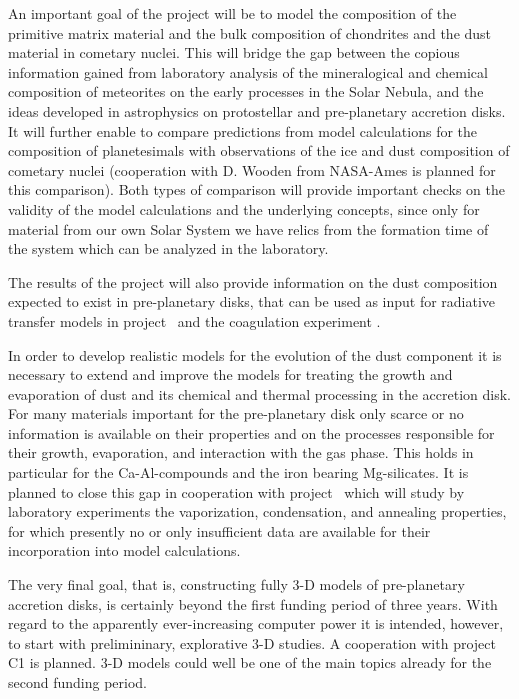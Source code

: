 An important goal of the project will be to model the composition
of the primitive matrix material and the bulk composition of chondrites 
and the dust material in cometary nuclei. This will bridge the gap between the
copious information gained from laboratory analysis of the
mineralogical and chemical composition of meteorites on the early
processes in the Solar Nebula, and the ideas developed in
astrophysics on protostellar and pre-planetary accretion disks. It
will further enable to compare predictions from model calculations
for the composition of planetesimals with observations of the ice
and dust composition of cometary nuclei (cooperation with D. Wooden
from NASA-Ames is planned for this comparison). Both types of comparison
will provide important checks on the validity of the model
calculations and the underlying concepts, since only for material
from our own Solar System we have relics from the formation time
of the system which can be analyzed in the laboratory.

The results of the project will also provide information on the
dust composition expected to exist in pre-planetary disks, that can
be used as input for radiative transfer models in project \projwolf\ and
the coagulation experiment \projblumtrie.

In order to develop realistic models for the evolution of the dust
component it is necessary to extend and improve the models for
treating the growth and evaporation of dust and its chemical and
thermal processing in the accretion disk. For many materials
important for the pre-planetary disk only scarce or no information
is available on their properties and on the processes responsible
for their growth, evaporation, and interaction with the gas phase.
This holds in particular for the Ca-Al-compounds and the iron
bearing Mg-silicates. It is planned to close this gap in
cooperation with project \projlattard\ which will study by
laboratory experiments the vaporization, condensation, and
annealing properties,
for which presently no or only insufficient data are available for
their incorporation into model calculations.

The very final goal, that is, constructing fully 3-D models of
pre-planetary accretion disks, is certainly beyond the first
funding period of three years. With regard to the apparently
ever-increasing computer power it is intended, however, to start
with prelimininary, explorative 3-D studies. A cooperation with
project C1 is planned. 3-D models could well be one of the main
topics already for the second funding period.

